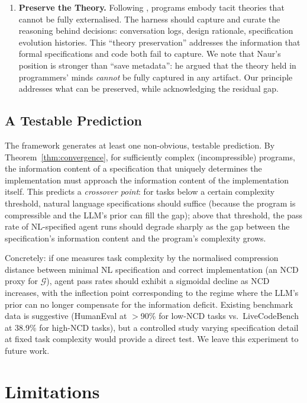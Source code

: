 \documentclass[11pt, a4paper, logo, copyright]{googledeepmind}
\begin{document}
\begin{enumerate}
    \item \textbf{Preserve the Theory.} Following \citet{naur1985programming}, programs embody tacit theories that cannot be fully externalised. The harness should capture and curate the reasoning behind decisions: conversation logs, design rationale, specification evolution histories. This ``theory preservation'' addresses the information that formal specifications and code both fail to capture. We note that Naur's position is stronger than ``save metadata'': he argued that the theory held in programmers' minds \emph{cannot} be fully captured in any artifact. Our principle addresses what can be preserved, while acknowledging the residual gap.
\end{enumerate}

\subsection{A Testable Prediction}

The framework generates at least one non-obvious, testable prediction. By Theorem~\ref{thm:convergence}, for sufficiently complex (incompressible) programs, the information content of a specification that uniquely determines the implementation must approach the information content of the implementation itself. This predicts a \emph{crossover point}: for tasks below a certain complexity threshold, natural language specifications should suffice (because the program is compressible and the LLM's prior can fill the gap); above that threshold, the pass rate of NL-specified agent runs should degrade sharply as the gap between the specification's information content and the program's complexity grows.

Concretely: if one measures task complexity by the normalised compression distance between minimal NL specification and correct implementation (an NCD proxy for $\mathcal{G}$), agent pass rates should exhibit a sigmoidal decline as NCD increases, with the inflection point corresponding to the regime where the LLM's prior can no longer compensate for the information deficit. Existing benchmark data is suggestive (HumanEval at $>$90\% for low-NCD tasks vs.\ LiveCodeBench at 38.9\% for high-NCD tasks), but a controlled study varying specification detail at fixed task complexity would provide a direct test. We leave this experiment to future work.


\section{Limitations}
\end{document}
